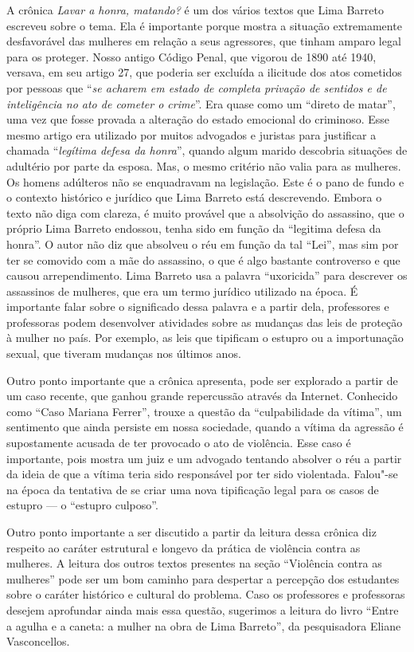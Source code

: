 \documentclass[11pt]{extarticle}
\begin{document}
{{A crônica {\textit{Lavar a honra, matando?}} é um dos vários textos
que Lima Barreto escreveu sobre o tema. Ela é importante porque mostra a
situação extremamente desfavorável das mulheres em relação a seus
agressores, que tinham amparo legal para os proteger. Nosso antigo
Código Penal, que vigorou de 1890 até 1940, versava, em seu artigo 27,
que poderia ser excluída a ilicitude dos atos cometidos por pessoas que
``\emph{se acharem em estado de completa privação de sentidos e de
inteligência no ato de cometer o crime}''. Era quase como um ``direto de
matar'', uma vez que fosse provada a alteração do estado emocional do
criminoso. Esse mesmo artigo era utilizado por muitos advogados e
juristas para justificar a chamada ``\emph{legítima defesa da honra}'',
quando algum marido descobria situações de adultério por parte da
esposa. Mas, o mesmo critério não valia para as mulheres. Os homens
adúlteros não se enquadravam na legislação. Este é o pano de fundo e o
contexto histórico e jurídico que Lima Barreto está descrevendo. Embora
o texto não diga com clareza, é muito provável que a absolvição do
assassino, que o próprio Lima Barreto endossou, tenha sido em função da
``legitima defesa da honra''. O autor não diz que absolveu o réu em
função da tal ``Lei'', mas sim por ter se comovido com a mãe do
assassino, o que é algo bastante controverso e que causou arrependimento.
Lima Barreto usa a palavra ``uxoricida'' para descrever os assassinos de
mulheres, que era um termo jurídico utilizado na época. É importante
falar sobre o significado dessa palavra e a partir dela, professores e
professoras podem desenvolver atividades sobre as mudanças das leis de
proteção à mulher no país. Por exemplo, as leis que tipificam o estupro
ou a importunação sexual, que tiveram mudanças nos últimos anos.

Outro ponto importante que a crônica apresenta, pode ser explorado a
partir de um caso recente, que ganhou grande repercussão através da
Internet. Conhecido como ``Caso Mariana Ferrer'', trouxe a questão da
``culpabilidade da vítima'', um sentimento que ainda persiste em nossa
sociedade, quando a vítima da agressão é supostamente acusada de ter
provocado o ato de violência. Esse caso é importante, pois mostra um
juiz e um advogado tentando absolver o réu a partir da ideia de que a
vítima teria sido responsável por ter sido violentada. Falou"-se na época
da tentativa de se criar uma nova tipificação legal para os casos de
estupro --- o ``estupro culposo''.

Outro ponto importante a ser discutido a partir da leitura dessa crônica
diz respeito ao caráter estrutural e longevo da prática de violência
contra as mulheres. A leitura dos outros textos presentes na seção
``Violência contra as mulheres'' pode ser um bom caminho para despertar
a percepção dos estudantes sobre o caráter histórico e cultural do
problema. Caso os professores e professoras desejem aprofundar ainda
mais essa questão, sugerimos a leitura do livro ``Entre a agulha e a
caneta: a mulher na obra de Lima Barreto'', da pesquisadora Eliane
Vasconcellos.

}}
\end{document}
